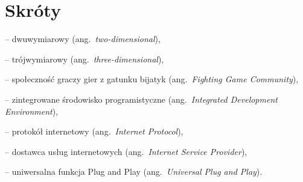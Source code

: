 % 
\chapter*{Skróty}
\label{sec:skroty}
\noindent\vspace{-\topsep-\partopsep-\parsep} 
\begin{description}[labelwidth=*]
  \item [2D] -- dwuwymiarowy (ang.\ \emph{two-dimensional}),
	\item [3D] -- trójwymiarowy (ang.\ \emph{three-dimensional}), 
	\item [FGC] -- społeczność graczy gier z gatunku bijatyk (ang.~\emph{Fighting Game Community}),
	\item [IDE] -- zintegrowane środowisko programistyczne (ang.~\emph{Integrated Development Environment}),
	\item [IP] -- protokół internetowy (ang.~\emph{Internet Protocol}),
	\item [ISP] -- dostawca usług internetowych (ang.~\emph{Internet Service Provider}),
  \item [UPnP] -- uniwersalna funkcja Plug and Play (ang.~\emph{Universal Plug and Play}).
	
\end{description}
